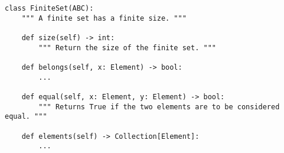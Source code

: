 \begin{verbatim}
class FiniteSet(ABC):
    """ A finite set has a finite size. """

    def size(self) -> int:
        """ Return the size of the finite set. """

    def belongs(self, x: Element) -> bool:
        ...

    def equal(self, x: Element, y: Element) -> bool:
        """ Returns True if the two elements are to be considered equal. """

    def elements(self) -> Collection[Element]:
        ...
\end{verbatim}